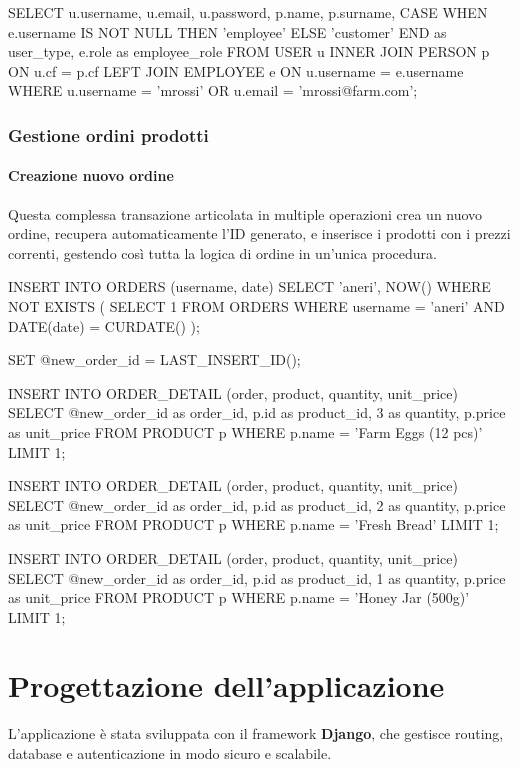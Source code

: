 \documentclass[a4paper,12pt]{report}
\begin{document}
\begin{sqlcode}[caption={Query per verifica login}]
SELECT u.username, u.email, u.password, p.name, p.surname,
       CASE WHEN e.username IS NOT NULL THEN 'employee' ELSE 'customer' END as user_type,
       e.role as employee_role 
FROM USER u 
INNER JOIN PERSON p ON u.cf = p.cf 
LEFT JOIN EMPLOYEE e ON u.username = e.username 
WHERE u.username = 'mrossi' OR u.email = 'mrossi@farm.com';
\end{sqlcode}

\subsection{Gestione ordini prodotti} 

\subsubsection{Creazione nuovo ordine} 
Questa complessa transazione articolata in multiple operazioni crea un nuovo ordine, recupera automaticamente l'ID generato, e inserisce i prodotti con i prezzi correnti, gestendo così tutta la logica di ordine in un'unica procedura.

\begin{sqlcode}[caption={Query per creazione ordine}]
INSERT INTO ORDERS (username, date) 
SELECT 'aneri', NOW() 
WHERE NOT EXISTS (
  SELECT 1 
  FROM ORDERS 
  WHERE username = 'aneri' AND DATE(date) = CURDATE()
);

SET @new_order_id = LAST_INSERT_ID();

INSERT INTO ORDER_DETAIL (order, product, quantity, unit_price) 
SELECT @new_order_id as order_id, p.id as product_id, 3 as quantity, p.price as unit_price 
FROM PRODUCT p 
WHERE p.name = 'Farm Eggs (12 pcs)' 
LIMIT 1;

INSERT INTO ORDER_DETAIL (order, product, quantity, unit_price) 
SELECT @new_order_id as order_id, p.id as product_id, 2 as quantity, p.price as unit_price 
FROM PRODUCT p 
WHERE p.name = 'Fresh Bread' 
LIMIT 1;

INSERT INTO ORDER_DETAIL (order, product, quantity, unit_price) 
SELECT @new_order_id as order_id, p.id as product_id, 1 as quantity, p.price as unit_price 
FROM PRODUCT p 
WHERE p.name = 'Honey Jar (500g)' 
LIMIT 1;
\end{sqlcode}



\chapter{Progettazione dell'applicazione}
L'applicazione è stata sviluppata con il framework \textbf{Django},
che gestisce routing,
database e autenticazione in modo sicuro e scalabile.
\end{document}
